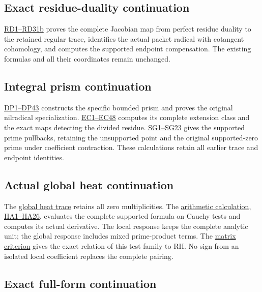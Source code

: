 \documentclass[
  10pt,
  a4paper,
]{article}
\begin{document}
\subsection{Exact residue-duality
continuation}\label{exact-residue-duality-continuation-1}

\href{COLLISION_RESIDUE_DUALITY_DERIVATION.md}{RD1--RD31b} proves the
complete Jacobian map from perfect residue duality to the retained
regular trace, identifies the actual packet radical with cotangent
cohomology, and computes the supported endpoint compensation. The
existing formulas and all their coordinates remain unchanged.

\subsection{Integral prism
continuation}\label{integral-prism-continuation}

\href{DISTINGUISHED_COLLISION_PRISM_DERIVATION.md}{DP1--DP43} constructs
the specific bounded prism and proves the original nilradical
specialization.
\href{NILRADICAL_COTANGENT_EXTENSION_CLASS_DERIVATION.md}{EC1--EC48}
computes its complete extension class and the exact maps detecting the
divided residue.
\href{SUPPORTED_PRISM_SPECTRUM_DERIVATION.md}{SG1--SG23} gives the
supported prime pullbacks, retaining the unsupported point and the
original supported-zero prime under coefficient contraction. These
calculations retain all earlier trace and endpoint identities.

\subsection{Actual global heat
continuation}\label{actual-global-heat-continuation}

The \href{ACTUAL_HEAT_ZERO_DISTRIBUTION_VARIATION.md}{global heat trace}
retains all zero multiplicities. The
\href{HEAT_CAUCHY_ARITHMETIC_DERIVATION.md}{arithmetic calculation,
HA1--HA26}, evaluates the complete supported formula on Cauchy tests and
computes its actual derivative. The local response keeps the complete
analytic unit; the global response includes mixed prime-product terms.
The \href{CAUCHY_WEIL_POSITIVITY_CRITERION.md}{matrix criterion} gives
the exact relation of this test family to RH. No sign from an isolated
local coefficient replaces the complete pairing.

\subsection{Exact full-form
continuation}\label{exact-full-form-continuation}
\end{document}
